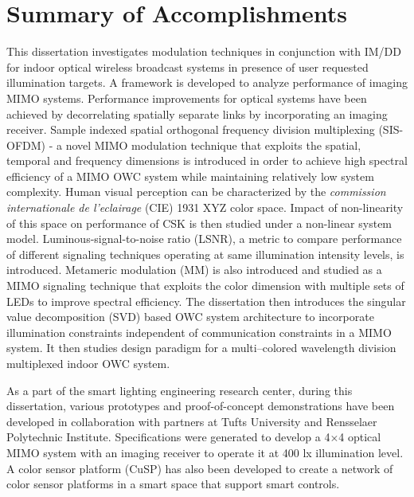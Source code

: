 \section{Summary of Accomplishments}
\label{sec:accomplishments}
\graphicspath{{_Intro/Figures/}}

This dissertation investigates modulation techniques in conjunction with IM/DD for indoor optical wireless broadcast systems in presence of user requested illumination targets. A framework is developed to analyze performance of imaging MIMO systems. Performance improvements for optical systems have been achieved by decorrelating spatially separate links by incorporating an imaging receiver. Sample indexed spatial orthogonal frequency division multiplexing (SIS-OFDM) - a novel MIMO modulation technique that exploits the spatial, temporal and frequency dimensions is introduced in order to achieve high spectral efficiency of a MIMO OWC system while maintaining relatively low system complexity. Human visual perception can be characterized by the \textit{commission internationale de l'eclairage} (CIE) 1931 XYZ color space. Impact of non-linearity of this space on performance of CSK is then studied under a non-linear system model. Luminous-signal-to-noise ratio (LSNR), a metric to compare performance of different signaling techniques operating at same illumination intensity levels, is introduced. Metameric modulation (MM) is also introduced and studied as a MIMO signaling technique that exploits the color dimension with multiple sets of LEDs to improve spectral efficiency. The dissertation then introduces the singular value decomposition (SVD) based OWC system architecture to incorporate illumination constraints independent of communication constraints in a MIMO system. It then studies design paradigm for a multi--colored wavelength division multiplexed indoor OWC system. 

As a part of the smart lighting engineering research center, during this dissertation, various prototypes and proof-of-concept demonstrations have been developed in collaboration with partners at Tufts University and Rensselaer Polytechnic Institute. Specifications were generated to develop a 4$\times$4 optical MIMO system with an imaging receiver to operate it at 400 lx illumination level. A color sensor platform (CuSP) has also been developed to create a network of color sensor platforms in a smart space that support smart controls.